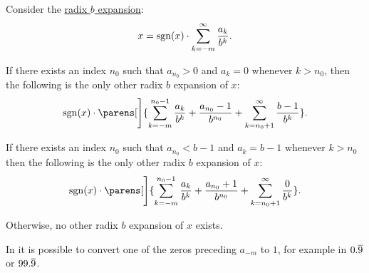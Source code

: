 \begin{proposition}\label{thm:radix_expansion_conversion}
  Consider the \hyperref[def:real_number_radix_expansion]{radix \( b \) expansion}:
  \begin{equation}\label{eq:thm:radix_expansion_conversion/base}
    x = \operatorname{sgn}(x) \cdot \sum_{k=-m}^\infty \frac {a_k} {b^k}.
  \end{equation}

  \begin{thmenum}
     If there exists an index \( n_0 \) such that \( a_{n_0} > 0 \) and \( a_k = 0 \) whenever \( k > n_0 \), then the following is the only other radix \( b \) expansion of \( x \):
    \begin{equation}\label{eq:thm:radix_expansion_conversion/zeros}
      \sgn(x) \cdot \parens[\Bigg]{ \sum_{k=-m}^{n_0 - 1} \frac {a_k} {b^k} + \frac {a_{n_0} - 1} {b^{n_0}} + \sum_{k=n_0 + 1}^\infty \frac {b - 1} {b^k} }.
    \end{equation}

     If there exists an index \( n_0 \) such that \( a_{n_0} < b - 1 \) and \( a_k = b - 1 \) whenever \( k > n_0 \) then the following is the only other radix \( b \) expansion of \( x \):
    \begin{equation}\label{eq:thm:radix_expansion_conversion/penultimate}
      \sgn(x) \cdot \parens[\Bigg]{ \sum_{k=-m}^{n_0 - 1} \frac {a_k} {b^k} + \frac {a_{n_0} + 1} {b^{n_0}} + \sum_{k=n_0 + 1}^\infty \frac 0 {b^k} }.
    \end{equation}

     Otherwise, no other radix \( b \) expansion of \( x \) exists.
  \end{thmenum}
\end{proposition}
\begin{comments}
  \item In  it is possible to convert one of the zeros preceding \( a_{-m} \) to \( 1 \), for example in \( 0.\oline{9} \) or \( 99.\oline{9} \).
\end{comments}
